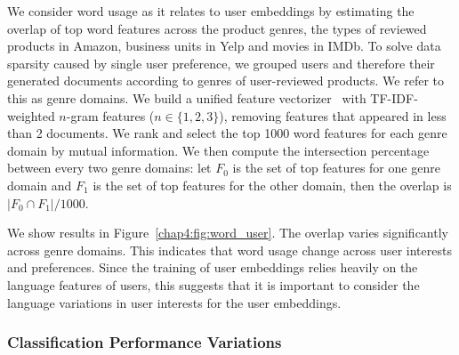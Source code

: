 We consider word usage as it relates to user embeddings by estimating the overlap of top word features across the product genres, the types of reviewed products in Amazon, business units in Yelp and movies in IMDb.
To solve data sparsity caused by single user preference, we grouped users and therefore their generated documents according to genres of user-reviewed products.
We refer to this as genre domains.
We build a unified feature vectorizer~\cite{pedregosa2011scikit} with TF-IDF-weighted $n$-gram features ($n \in \{1,2,3\}$), removing features that appeared in less than 2 documents.
We rank and select the top 1000 word features for each genre domain by mutual information.
We then compute the intersection percentage between every two genre domains: let $F_0$ is the set of top features for one genre domain and $F_1$ is the set of top features for the other domain, then the overlap is $|F_0 \cap F_1|/1000$.

We show results in Figure~\ref{chap4:fig:word_user}.
The overlap varies significantly across genre domains. 
This indicates that word usage change across user interests and preferences. 
Since the training of user embeddings relies heavily on the language features of users, this suggests that it is important to consider the language variations in user interests for the user embeddings.


\subsubsection{Classification Performance Variations}

